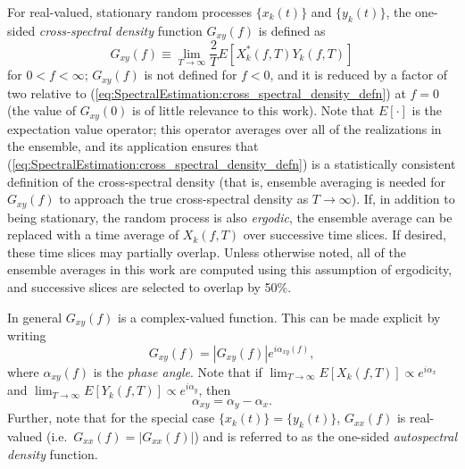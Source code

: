 For real-valued, stationary random processes $\{x_k(t)\}$ and $\{y_k(t)\}$,
the one-sided \emph{cross-spectral density} function $G_{xy}(f)$ is defined as
\begin{equation}
  G_{xy}(f)
  \equiv
  \lim_{T \rightarrow \infty}
  \frac{2}{T} E \left[ X_k^*(f, T) Y_k(f, T) \right]
  \label{eq:SpectralEstimation:cross_spectral_density_defn}
\end{equation}
for $0 < f < \infty$;
$G_{xy}(f)$ is not defined for $f < 0$, and
it is reduced by a factor of two relative to
(\ref{eq:SpectralEstimation:cross_spectral_density_defn}) at $f = 0$
(the value of $G_{xy}(0)$ is of little relevance to this work).
Note that $E[\cdot]$ is the expectation value operator;
this operator averages over all of the realizations in the ensemble, and
its application ensures that
(\ref{eq:SpectralEstimation:cross_spectral_density_defn})
is a statistically consistent definition of the cross-spectral density
(that is, ensemble averaging is needed for $G_{xy}(f)$
to approach the true cross-spectral density
as $T \rightarrow \infty$). %
If, in addition to being stationary,
the random process is also \emph{ergodic},
the ensemble average can be replaced
with a time average of $X_k(f, T)$
over successive time slices.
If desired, these time slices may partially overlap.
Unless otherwise noted,
all of the ensemble averages in this work are computed
using this assumption of ergodicity, and
successive slices are selected to overlap by 50\%.

In general $G_{xy}(f)$ is a complex-valued function.
This can be made explicit by writing
\begin{equation}
  G_{xy}(f) = \left| G_{xy}(f) \right| e^{i \alpha_{xy}(f)},
  \label{eq:SpectralEstimation:cross_spectral_density_explicit_complex}
\end{equation}
where $\alpha_{xy}(f)$ is the \emph{phase angle}.
Note that if
$\lim_{T \rightarrow \infty} E[X_k(f, T)] \propto e^{i \alpha_x}$ and
$\lim_{T \rightarrow \infty} E[Y_k(f, T)] \propto e^{i \alpha_y}$, then
\begin{equation}
  \alpha_{xy} = \alpha_y - \alpha_x.
\end{equation}
Further, note that for the special case $\{x_k(t)\} = \{y_k(t)\}$,
$G_{xx}(f)$ is real-valued (i.e.\ $G_{xx}(f) = |G_{xx}(f)|$) and
is referred to as the one-sided \emph{autospectral density} function.

